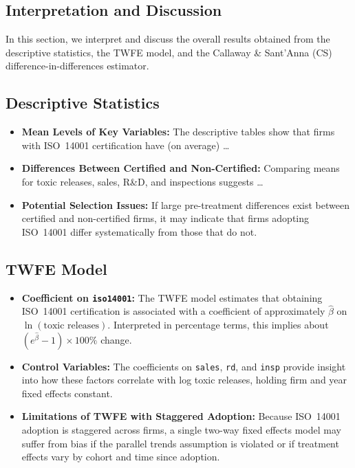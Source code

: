 \documentclass[10pt, oneside]{article}
\begin{document}
\subsection{Interpretation and Discussion}
\label{sec:interpretation}

In this section, we interpret and discuss the overall results obtained from the descriptive statistics, the TWFE model, and the Callaway \& Sant’Anna (CS) difference-in-differences estimator.

\subsection{Descriptive Statistics}

\begin{itemize}
    \item \textbf{Mean Levels of Key Variables:} 
    The descriptive tables show that firms with ISO~14001 certification have (on average) \dots 
    
    \item \textbf{Differences Between Certified and Non-Certified:} 
    Comparing means for toxic releases, sales, R\&D, and inspections suggests \dots
    
    \item \textbf{Potential Selection Issues:} 
    If large pre-treatment differences exist between certified and non-certified firms, 
    it may indicate that firms adopting ISO~14001 differ systematically from those that do not.
\end{itemize}

\subsection{TWFE Model}

\begin{itemize}
    \item \textbf{Coefficient on \texttt{iso14001}:} 
    The TWFE model estimates that obtaining ISO~14001 certification is associated with a 
    coefficient of approximately $\hat{\beta}$ on $\ln(\text{toxic releases})$. 
    Interpreted in percentage terms, this implies about $(e^{\hat{\beta}} - 1)\times 100\%$ change.
    
    \item \textbf{Control Variables:} 
    The coefficients on \texttt{sales}, \texttt{rd}, and \texttt{insp} provide insight into 
    how these factors correlate with log toxic releases, holding firm and year fixed effects constant.
    
    \item \textbf{Limitations of TWFE with Staggered Adoption:} 
    Because ISO~14001 adoption is staggered across firms, a single two-way fixed effects model 
    may suffer from bias if the parallel trends assumption is violated or if treatment effects 
    vary by cohort and time since adoption.
\end{itemize}
\end{document}
